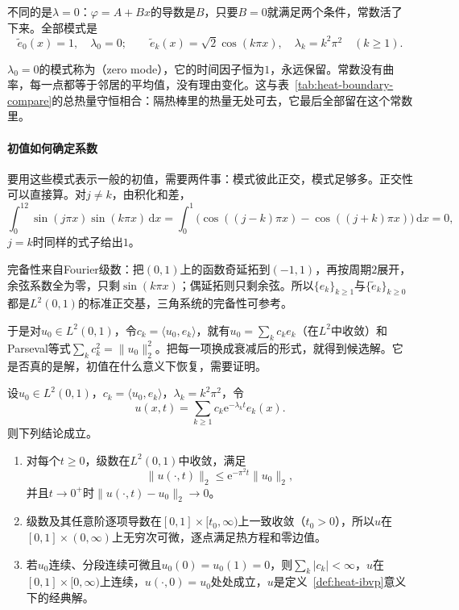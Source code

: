 不同的是$\lambda=0$：$\varphi=A+Bx$的导数是$B$，只要$B=0$就满足两个条件，常数活了下来。全部模式是
\begin{equation}
 \tilde{e}_0(x)=1,\quad\lambda_0=0;\qquad \tilde{e}_k(x)=\sqrt2\cos(k\pi x),\quad\lambda_k=k^2\pi^2\quad(k\geq1) .
 \label{eq:heat-neumann-modes}
\end{equation}

$\lambda_0=0$的模式称为（zero mode），它的时间因子恒为$1$，永远保留。常数没有曲率，每一点都等于邻居的平均值，没有理由变化。这与表~\ref{tab:heat-boundary-compare}的总热量守恒相合：隔热棒里的热量无处可去，它最后全部留在这个常数里。

\paragraph{初值如何确定系数}
要用这些模式表示一般的初值，需要两件事：模式彼此正交，模式足够多。正交性可以直接算。对$j\neq k$，由积化和差，
\[
 \int_0^12\sin(j\pi x)\sin(k\pi x)\,\mathrm{d}x
 =\int_0^1\bigl(\cos((j-k)\pi x)-\cos((j+k)\pi x)\bigr)\,\mathrm{d}x=0 ,
\]
$j=k$时同样的式子给出$1$。

完备性来自Fourier级数：把$(0,1)$上的函数奇延拓到$(-1,1)$，再按周期$2$展开，余弦系数全为零，只剩$\sin(k\pi x)$；偶延拓则只剩余弦。所以$\{e_k\}_{k\geq1}$与$\{\tilde{e}_k\}_{k\geq0}$都是$L^2(0,1)$的标准正交基，三角系统的完备性可参考。

于是对$u_0\in L^2(0,1)$，令$c_k=\langle u_0,e_k\rangle$，就有$u_0=\sum_kc_ke_k$（在$L^2$中收敛）和Parseval等式$\sum_kc_k^2=\lVert u_0\rVert_2^2$。把每一项换成衰减后的形式，就得到候选解。它是否真的是解，初值在什么意义下恢复，需要证明。

\begin{theorem}[区间上的模式解]
\label{thm:heat-series}
设$u_0\in L^2(0,1)$，$c_k=\langle u_0,e_k\rangle$，$\lambda_k=k^2\pi^2$，令
\begin{equation}
 u(x,t)=\sum_{k\geq1}c_k\mathrm{e}^{-\lambda_kt}e_k(x) .
 \label{eq:heat-sine-solution}
\end{equation}
则下列结论成立。
\begin{enumerate}
 \item 对每个$t\geq0$，级数在$L^2(0,1)$中收敛，满足
 \begin{equation}
  \lVert u(\cdot,t)\rVert_2\leq\mathrm{e}^{-\pi^2t}\lVert u_0\rVert_2,
  \label{eq:heat-series-decay}
 \end{equation}
 并且$t\to0^+$时$\lVert u(\cdot,t)-u_0\rVert_2\to0$。
 \item 级数及其任意阶逐项导数在$[0,1]\times[t_0,\infty)$上一致收敛（$t_0>0$），所以$u$在$[0,1]\times(0,\infty)$上无穷次可微，逐点满足热方程和零边值。
 \item 若$u_0$连续、分段连续可微且$u_0(0)=u_0(1)=0$，则$\sum_k\lvert c_k\rvert<\infty$，$u$在$[0,1]\times[0,\infty)$上连续，$u(\cdot,0)=u_0$处处成立，$u$是定义~\ref{def:heat-ibvp}意义下的经典解。
\end{enumerate}
\end{theorem}

